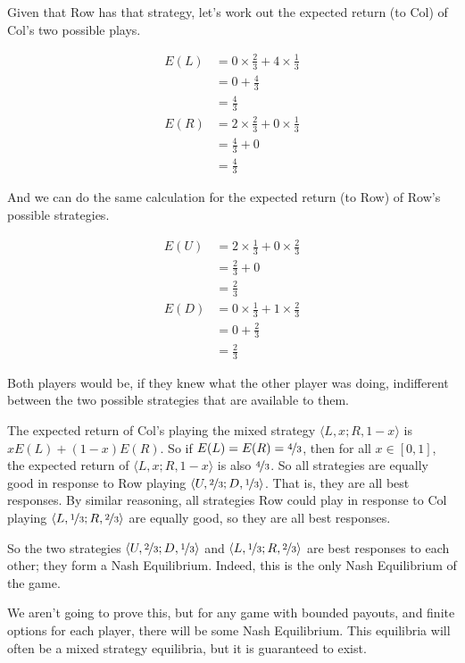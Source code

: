 \documentclass[
  11pt,
  letterpaper,
]{scrbook}
\begin{document}
Given that Row has that strategy, let's work out the expected return (to
Col) of Col's two possible plays.

\begin{align*}
E(L) &= 0 \times \frac{2}{3} + 4 \times \frac{1}{3} \\
&= 0 + \frac{4}{3} \\
&= \frac{4}{3} \\
E(R) &= 2 \times \frac{2}{3} + 0 \times \frac{1}{3} \\
&= \frac{4}{3} + 0 \\
&= \frac{4}{3}
\end{align*}

And we can do the same calculation for the expected return (to Row) of
Row's possible strategies.

\begin{align*}
E(U) &= 2 \times \frac{1}{3} + 0 \times \frac{2}{3} \\
&= \frac{2}{3} + 0\\
&= \frac{2}{3} \\
E(D) &= 0 \times \frac{1}{3} + 1 \times \frac{2}{3} \\
&= 0 + \frac{2}{3} \\
&= \frac{2}{3}
\end{align*}

Both players would be, if they knew what the other player was doing,
indifferent between the two possible strategies that are available to
them.

The expected return of Col's playing the mixed strategy
\(\langle L, x; R, 1-x \rangle\) is \(xE(L) + (1-x)E(R)\). So if
\(E(L) = E(R) = \nicefrac{4}{3}\), then for all \(x \in [0, 1]\), the
expected return of \(\langle L, x; R, 1-x \rangle\) is also
\(\nicefrac{4}{3}\). So all strategies are equally good in response to
Row playing \(\langle U, \nicefrac{2}{3}; D, \nicefrac{1}{3} \rangle\).
That is, they are all best responses. By similar reasoning, all
strategies Row could play in response to Col playing
\(\langle L, \nicefrac{1}{3}; R, \nicefrac{2}{3} \rangle\) are equally
good, so they are all best responses.

So the two strategies
\(\langle U, \nicefrac{2}{3}; D, \nicefrac{1}{3} \rangle\) and
\(\langle L, \nicefrac{1}{3}; R, \nicefrac{2}{3} \rangle\) are best
responses to each other; they form a Nash Equilibrium. Indeed, this is
the only Nash Equilibrium of the game.

We aren't going to prove this, but for any game with bounded payouts,
and finite options for each player, there will be some Nash Equilibrium.
This equilibria will often be a mixed strategy equilibria, but it is
guaranteed to exist.
\end{document}
